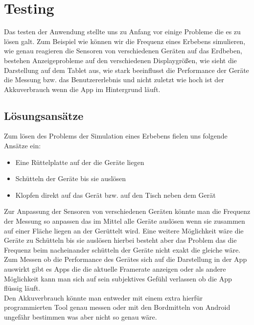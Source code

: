 \section{Testing}

Das testen der Anwendung stellte uns zu Anfang vor einige Probleme die es zu lösen galt. Zum Beispiel wie können wir die Frequenz eines Erbebens simulieren, wie genau reagieren die Sensoren von verschiedenen Geräten auf das Erdbeben, bestehen Anzeigeprobleme auf den verschiedenen Displaygrößen, wie sieht die Darstellung auf dem Tablet aus, wie stark beeinflusst die Performance der Geräte die Messung bzw. das Benutzererlebnis und nicht zuletzt wie hoch ist der Akkuverbrauch wenn die App im Hintergrund läuft.

\subsection{Lösungsansätze}

Zum lösen des Problems der Simulation eines Erbebens fielen uns folgende Ansätze ein:

\begin{itemize}
	\item Eine Rüttelplatte auf der die Geräte liegen
	\item Schütteln der Geräte bis sie auslösen
	\item Klopfen direkt auf das Gerät bzw. auf den Tisch neben dem Gerät
\end{itemize}

Zur Anpassung der Sensoren von verschiedenen Geräten könnte man die Frequenz der Messung so anpassen das im Mittel alle Geräte auslösen wenn sie zusammen auf einer Fläche liegen an der Gerüttelt wird. Eine weitere Möglichkeit wäre die Geräte zu Schütteln bis sie auslösen hierbei besteht aber das Problem das die Frequenz beim nacheinander schütteln der Geräte nicht exakt die gleiche wäre.\\

Zum Messen ob die Performance des Gerätes sich auf die Darstellung in der App auswirkt gibt es Apps die die aktuelle Framerate anzeigen oder als andere Möglichkeit kann man sich auf sein subjektives Gefühl verlassen ob die App flüssig läuft.\\

Den Akkuverbrauch könnte man entweder mit einem extra hierfür programmierten Tool genau messen oder mit den Bordmitteln von Android ungefähr bestimmen was aber nicht so genau wäre.\\

